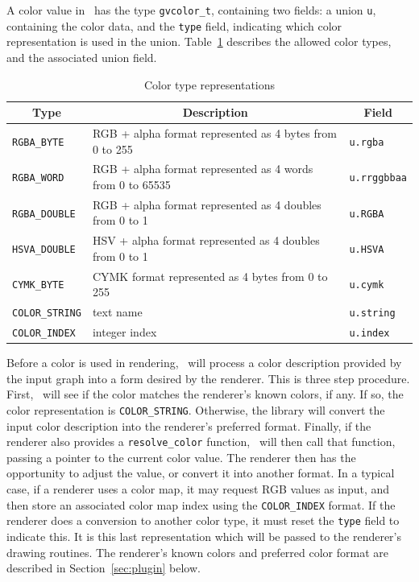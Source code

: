 A color value in \gviz\ has the type {\tt gvcolor\_t}, containing
two fields: a union {\tt u}, containing the color data, and the
{\tt type} field, indicating which color representation is used in
the union. Table~\ref{table:color} describes the allowed color types,
and the associated union field.
\begin{table}[htb]
\centering
\begin{tabular}[t]{|l|p{3.5in}|l|} \hline
\multicolumn{1}{|c|}{Type} & \multicolumn{1}{c|}{Description} & \multicolumn{1}{c|}{Field}\\ \hline
{\tt RGBA\_BYTE} & RGB + alpha format represented as 4 bytes from 0 to 255 & {\tt u.rgba} \\
{\tt RGBA\_WORD} & RGB + alpha format represented as 4 words from 0 to 65535 & {\tt u.rrggbbaa} \\
{\tt RGBA\_DOUBLE} & RGB + alpha format represented as 4 doubles from 0 to 1 & {\tt u.RGBA} \\
{\tt HSVA\_DOUBLE} & HSV + alpha format represented as 4 doubles from 0 to 1 & {\tt u.HSVA} \\
{\tt CYMK\_BYTE} & CYMK format represented as 4 bytes from 0 to 255 & {\tt u.cymk} \\
{\tt COLOR\_STRING} & text name & {\tt u.string} \\
{\tt COLOR\_INDEX} & integer index & {\tt u.index} \\
\hline
\end{tabular}
\caption{Color type representations}
\label{table:color}
\end{table}

Before a color is used in rendering, \gviz\ will process a color description
provided by the input graph into a form desired by the renderer.
This is three step procedure. First, \gviz\ will see if the color matches
the renderer's known colors, if any.
If so, the color representation is {\tt COLOR\_STRING}. Otherwise, the
library will convert the input color description into the renderer's
preferred format. Finally, if the
renderer also provides a {\tt resolve\_color} function, \gviz\ will then
call that function, passing a pointer to the current color value. The
renderer then has the opportunity to adjust the value, or convert it
into another format. In a typical case, if a renderer uses a color map,
it may request RGB values as input, and then store an associated
color map index using the {\tt COLOR\_INDEX} format. If the renderer
does a conversion to another color type, it must 
reset the {\tt type} field to indicate this.
It is this last representation which will be passed to the renderer's
drawing routines.
The renderer's known colors and preferred color format are
described in Section~\ref{sec:plugin} below.
